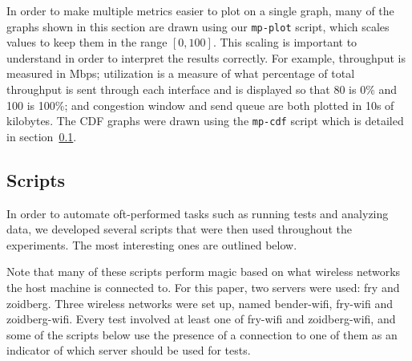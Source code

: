 In order to make multiple metrics easier to plot on a single graph, many of the
graphs shown in this section are drawn using our \texttt{mp-plot} script, which
scales values to keep them in the range $[0,100]$. This scaling is important to
understand in order to interpret the results correctly. For example, throughput
is measured in Mbps; utilization is a measure of what percentage of total
throughput is sent through each interface and is displayed so that 80 is
0\% and 100 is 100\%; and congestion window and send queue are both plotted in
10s of kilobytes. The CDF graphs were drawn using the \texttt{mp-cdf} script
which is detailed in section~\ref{sec:met:scripts}.

\subsection{Scripts}
\label{sec:met:scripts}
In order to automate oft-performed tasks such as running tests and analyzing
data, we developed several scripts that were then used throughout the
experiments. The most interesting ones are outlined below.

Note that many of these scripts perform magic based on what wireless networks
the host machine is connected to. For this paper, two servers were used: fry and
zoidberg. Three wireless networks were set up, named bender-wifi, fry-wifi and
zoidberg-wifi. Every test involved at least one of fry-wifi and zoidberg-wifi,
and some of the scripts below use the presence of a connection to one of them as
an indicator of which server should be used for tests.

